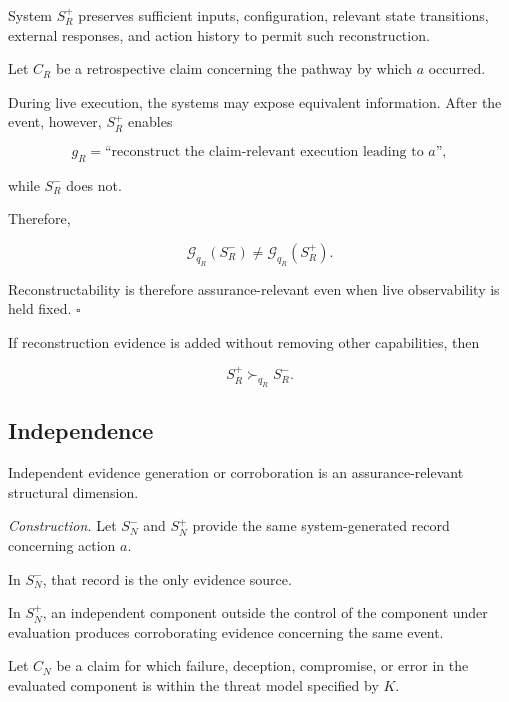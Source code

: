 System \(S_R^{+}\) preserves sufficient inputs, configuration, relevant state transitions, external responses, and action history to permit such reconstruction.

Let \(C_R\) be a retrospective claim concerning the pathway by which \(a\) occurred.

During live execution, the systems may expose equivalent information.
After the event, however, \(S_R^{+}\) enables

\begin{equation}
  g_R
  =
  \text{``reconstruct the claim-relevant execution leading to }a\text{''},
\end{equation}

while \(S_R^{-}\) does not.

Therefore,

\begin{equation}
  \mathcal{G}_{q_R}(S_R^{-})
  \neq
  \mathcal{G}_{q_R}(S_R^{+}).
\end{equation}

Reconstructability is therefore assurance-relevant even when live observability is held fixed.
\hfill\(\square\)

If reconstruction evidence is added without removing other capabilities, then

\begin{equation}
  S_R^{+}
  \succ_{q_R}
  S_R^{-}.
\end{equation}

\subsection{Independence}
\label{aa.subsec.independence-contribution}

\begin{proposition}
  \label{se320.prop.IndependenceContribution}
  Independent evidence generation or corroboration is an
  assurance-relevant structural dimension.
\end{proposition}

\textit{Construction.}
Let \(S_N^{-}\) and \(S_N^{+}\) provide the same system-generated record concerning action \(a\).

In \(S_N^{-}\), that record is the only evidence source.

In \(S_N^{+}\), an independent component outside the control of the component under evaluation produces corroborating evidence concerning the same event.

Let \(C_N\) be a claim for which failure, deception, compromise, or error in the evaluated component is within the threat model specified by \(K\).

